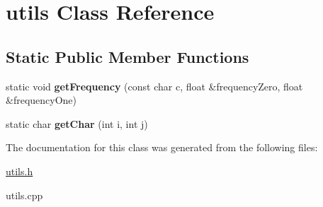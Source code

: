 \hypertarget{classutils}{}\section{utils Class Reference}
\label{classutils}
\subsection*{Static Public Member Functions}
\begin{DoxyCompactItemize}
\item 
\mbox{\label{classutils_a08e5b6d7cb66ddc0fd926a1d868554eb}} 
static void {\bfseries get\+Frequency} (const char c, float \&frequency\+Zero, float \&frequency\+One)
\item 
\mbox{\label{classutils_aed5423c749d44ed2eb1af462324d1799}} 
static char {\bfseries get\+Char} (int i, int j)
\end{DoxyCompactItemize}


The documentation for this class was generated from the following files\+:\begin{DoxyCompactItemize}
\item 
\hyperlink{utils_8h}{utils.\+h}\item 
utils.\+cpp\end{DoxyCompactItemize}
